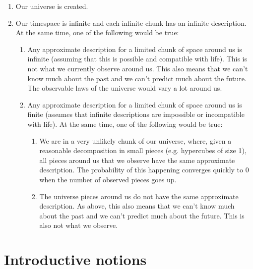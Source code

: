 \documentclass[a4paper
,draft
]{article}
\begin{document}
\begin{enumerate}
\item Our universe is created.
\item Our timespace is infinite and each infinite chunk has an infinite
      description. At the same time, one of the following would be true:
      \begin{enumerate}
      \item Any approximate description for a limited chunk of space around us
            is infinite (assuming that this is possible and compatible with
            life). This is not what we currently observe around us.
            This also means that we can't know much about the past and we can't
            predict much about the future. The observable laws of the
            universe would vary a lot around us.
      \item Any approximate description for a limited chunk of space around us
            is finite (assumes that infinite descriptions are impossible or
            incompatible with life). At the same time, one of the following
            would be true:
            \begin{enumerate}
            \item We are in a very unlikely chunk of our universe, where,
                  given a reasonable decomposition in small pieces (e.g.
                  hypercubes of size 1), all pieces around us that we observe
                  have the same approximate description. The probability
                  of this happening converges quickly to $0$ when the number
                  of observed pieces goes up.
            \item The universe pieces around us do not have the same
                  approximate description. As above, this also means that
                  we can't know much about the past and we can't
                  predict much about the future. This is also not what we
                  observe.
            \end{enumerate}
      \end{enumerate}
\end{enumerate}


\section{Introductive notions}
\end{document}
